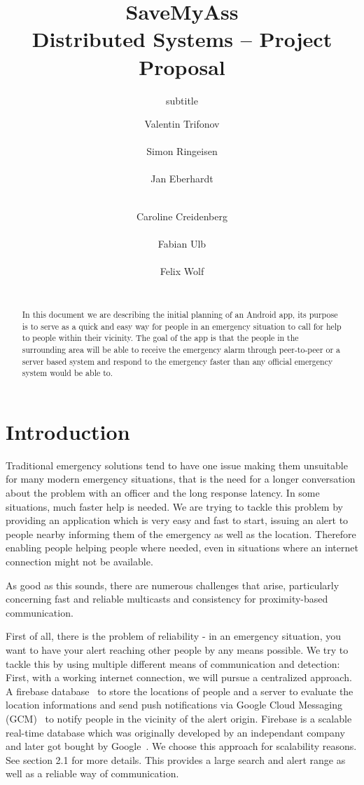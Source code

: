 \documentclass{report}
\title{SaveMyAss\\
\normalsize{Distributed Systems -- Project Proposal}}
\subtitle{subtitle}
\author{
%
%
\alignauthor \normalsize{Valentin Trifonov}\\
	\affaddr{\normalsize{ETH ID 13-941-679}}\\
	\email{\normalsize{vatrifon@student.ethz.ch}}
\alignauthor \normalsize{Simon Ringeisen}\\
	\affaddr{\normalsize{ETH ID 13-934-930}}\\
	\email{\normalsize{rsimon@student.ethz.ch}}
\alignauthor \normalsize{Jan Eberhardt}\\
	\affaddr{\normalsize{ETH ID 13-925-417}}\\
	\email{\normalsize{ebjan@student.ethz.ch}}
\and
\alignauthor \normalsize{Caroline Creidenberg}\\
	\affaddr{\normalsize{ETH 15-907-421}}\\
	\email{\normalsize{ccreiden@student.ethz.ch}}
\alignauthor \normalsize{Fabian Ulb}\\
	\affaddr{\normalsize{ETH ID 13-931-951}}\\
	\email{\normalsize{fabianu@student.ethz.ch}}
\alignauthor \normalsize{Felix Wolf}\\
	\affaddr{\normalsize{ETH ID 13-927-983}}\\
	\email{\normalsize{fewolf@student.ethz.ch}}
}
\begin{document}
\maketitle

\begin{abstract}
In this document we are describing the initial planning of an Android app, its purpose is to serve as a quick and easy way for people in an emergency situation to call for help to people within their vicinity. The goal of the app is that the people in the surrounding area will be able to receive the emergency alarm through peer-to-peer or a server based system and respond to the emergency faster than any official emergency system would be able to. 
\end{abstract}

\section{Introduction}

Traditional emergency solutions tend to have one issue making them unsuitable for many modern emergency situations, that is the need for a longer conversation about the problem with an officer and the long response latency. In some situations, much faster help is needed.
We are trying to tackle this problem by providing an application which is very easy and fast to start, issuing an alert to people nearby informing them of the emergency as well as the location. Therefore enabling people helping people where needed, even in situations where an internet connection might not be available.

As good as this sounds, there are numerous challenges that arise, particularly concerning fast and reliable multicasts and consistency for proximity-based communication.

First of all, there is the problem of reliability - in an emergency situation, you want to have your alert reaching other people by any means possible. We try to tackle this by using multiple different means of communication and detection:
First, with a working internet connection, we will pursue a centralized approach. A firebase database~\cite{firebase} to store the locations of people and a server to evaluate the location informations and send push notifications via Google Cloud Messaging (GCM)~\cite{google_cloud_messaging} to notify people in the vicinity of the alert origin. Firebase is a scalable real-time database which was originally developed by an independant company and later got bought by Google~\cite{firebase}. We choose this approach for scalability reasons. See section 2.1 for more details. This provides a large search and alert range as well as a reliable way of communication.
\end{document}
